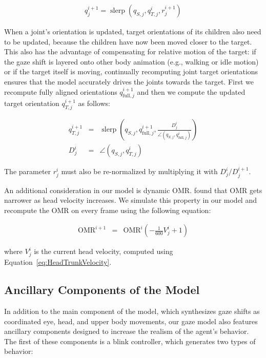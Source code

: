 \begin{eqnarray} \label{eq:RotUpdate}
q^{i+1}_j = \mathop{slerp}(q_{S,j}, q^i_{T,j}, r^{i+1}_j)
\end{eqnarray}

When a joint's orientation is updated, target orientations of its children also need to be updated, because the children have now been moved closer to the target. This also has the advantage of compensating for relative motion of the target: if the gaze shift is layered onto other body animation (e.g., walking or idle motion) or if the target itself is moving, continually recomputing joint target orientations ensures that the model accurately drives the joints towards the target. First we recompute fully aligned orientations $q^{i+1}_{\mathrm{full},j}$ and then we compute the updated target orientation $q^{i+1}_{T,j}$ as follows:

\begin{eqnarray} \label{eq:TargetRotUpdate}
q^{i+1}_{T,j} &=& \mathop{slerp}(q_{S,j}, q^{i+1}_{\mathrm{full},j}, \frac{D^i_j}{\angle(q_{S,j}, q^i_{\mathrm{full},j})}) \\
D^i_j &=& \angle(q_{S,j}, q^i_{T,j}) \nonumber
\end{eqnarray}

The parameter $r^i_j$ must also be re-normalized by multiplying it with $D^i_j / D^{i+1}_j$.

An additional consideration in our model is dynamic OMR. \citet{guitton1987gaze} found that OMR gets narrower as head velocity increases. We simulate this property in our model and recompute the OMR on every frame using the following equation:

\begin{eqnarray} \label{eq:OMRUpdate}
\mathrm{OMR}^{i+1} &=& \mathrm{OMR}^i (-\frac{1}{600} V^i_j + 1)
\end{eqnarray}

where $V^i_j$ is the current head velocity, computed using Equation~\ref{eq:HeadTrunkVelocity}.

\subsection{Ancillary Components of the Model}

In addition to the main component of the model, which synthesizes gaze shifts as coordinated eye, head, and upper body movements, our gaze model also features ancillary components designed to increase the realism of the agent's behavior. The first of these components is a blink controller, which generates two types of behavior:

